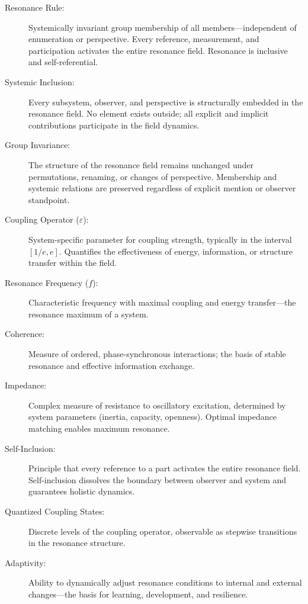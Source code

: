 \documentclass[12pt]{iopart}
\begin{document}
\begin{description}
	\item[Resonance Rule:]  
	Systemically invariant group membership of all members—independent of enumeration or perspective. Every reference, measurement, and participation activates the entire resonance field. Resonance is inclusive and self-referential.
	
	\item[Systemic Inclusion:]  
	Every subsystem, observer, and perspective is structurally embedded in the resonance field. No element exists outside; all explicit and implicit contributions participate in the field dynamics.
	
	\item[Group Invariance:]  
	The structure of the resonance field remains unchanged under permutations, renaming, or changes of perspective. Membership and systemic relations are preserved regardless of explicit mention or observer standpoint.
	
	\item[Coupling Operator ($\varepsilon$):]  
	System-specific parameter for coupling strength, typically in the interval $[1/e, e]$. Quantifies the effectiveness of energy, information, or structure transfer within the field.
	
	\item[Resonance Frequency ($f$):]  
	Characteristic frequency with maximal coupling and energy transfer—the resonance maximum of a system.
	
	\item[Coherence:]  
	Measure of ordered, phase-synchronous interactions; the basis of stable resonance and effective information exchange.
	
	\item[Impedance:]  
	Complex measure of resistance to oscillatory excitation, determined by system parameters (inertia, capacity, openness). Optimal impedance matching enables maximum resonance.
	
	\item[Self-Inclusion:]  
	Principle that every reference to a part activates the entire resonance field. Self-inclusion dissolves the boundary between observer and system and guarantees holistic dynamics.
	
	\item[Quantized Coupling States:]  
	Discrete levels of the coupling operator, observable as stepwise transitions in the resonance structure.
	
	\item[Adaptivity:]  
	Ability to dynamically adjust resonance conditions to internal and external changes—the basis for learning, development, and resilience.
	

\end{description}
\end{document}

